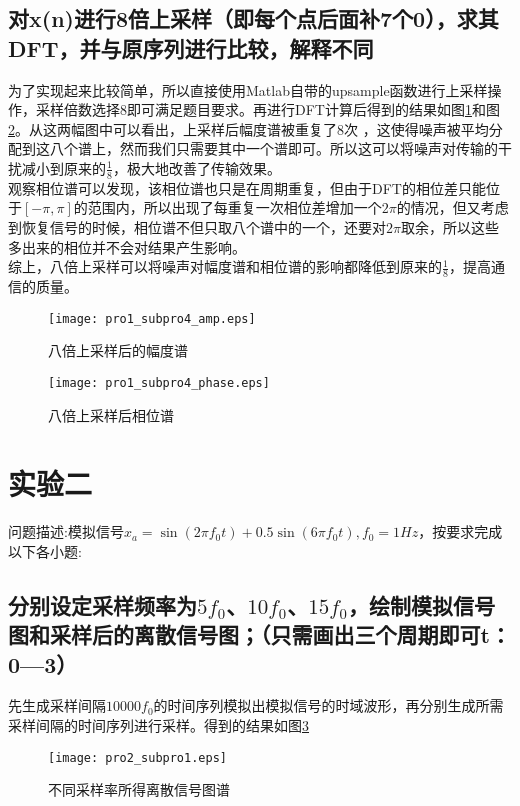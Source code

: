 \documentclass[aps,letterpaper,10pt]{revtex4}
\begin{document}
\begin{CJK}{UTF8}{gkai}
\subsection{对x(n)进行8倍上采样（即每个点后面补7个0），求其DFT，并与原序列进行比较，解释不同}
为了实现起来比较简单，所以直接使用Matlab自带的upsample函数进行上采样操作，采样倍数选择8即可满足题目要求。再进行DFT计算后得到的结果如图\ref{pro1_fig5}和图\ref{pro1_fig6}。从这两幅图中可以看出，上采样后幅度谱被重复了8次 ，这使得噪声被平均分配到这八个谱上，然而我们只需要其中一个谱即可。所以这可以将噪声对传输的干扰减小到原来的$\frac{1}{8}$，极大地改善了传输效果。\\
观察相位谱可以发现，该相位谱也只是在周期重复，但由于DFT的相位差只能位于$[-\pi,\pi]$的范围内，所以出现了每重复一次相位差增加一个$2\pi$的情况，但又考虑到恢复信号的时候，相位谱不但只取八个谱中的一个，还要对$2\pi$取余，所以这些多出来的相位并不会对结果产生影响。\\
综上，八倍上采样可以将噪声对幅度谱和相位谱的影响都降低到原来的$\frac{1}{8}$，提高通信的质量。
\begin{figure}
  \centering
  \texttt{[image: pro1\_subpro4\_amp.eps]}
  \caption{八倍上采样后的幅度谱}
  \label{pro1_fig5}
\end{figure}

\begin{figure}
  \centering
  \texttt{[image: pro1\_subpro4\_phase.eps]}
  \caption{八倍上采样后相位谱}
  \label{pro1_fig6}
\end{figure}
\section{实验二}
问题描述:模拟信号$x_a=\sin(2\pi f_0t)+0.5\sin(6\pi f_0t),f_0=1Hz$，按要求完成以下各小题:
\subsection{分别设定采样频率为$5f_0$、$10f_0$、$15f_0$，绘制模拟信号图和采样后的离散信号图；（只需画出三个周期即可t：0—3）}
先生成采样间隔$10000f_0$的时间序列模拟出模拟信号的时域波形，再分别生成所需采样间隔的时间序列进行采样。得到的结果如图\ref{pro2_fig1}
\begin{figure}
  \centering
  \texttt{[image: pro2\_subpro1.eps]}
  \caption{不同采样率所得离散信号图谱}
  \label{pro2_fig1}
\end{figure}

\end{CJK}
\end{document}
